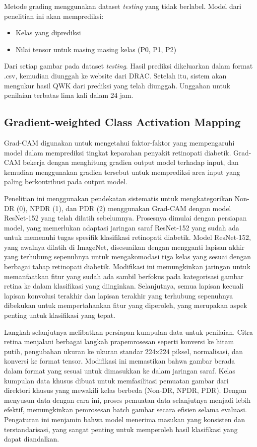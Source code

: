 Metode grading menggunakan dataset \emph{testing} yang tidak berlabel. Model dari penelitian ini akan memprediksi:
\begin{itemize}
	\item Kelas yang diprediksi
	\item Nilai tensor untuk masing masing kelas (P0, P1, P2)
\end{itemize}
Dari setiap gambar pada dataset \emph{testing}. Hasil prediksi dikeluarkan dalam format .csv, kemudian diunggah ke website dari DRAC.
Setelah itu, sistem akan mengukur hasil QWK dari prediksi yang telah diunggah. Unggahan untuk penilaian terbatas lima kali dalam 24 jam.

\subsection{Gradient-weighted Class Activation Mapping}
\label{sec:327}
Grad-CAM digunakan untuk mengetahui faktor-faktor yang mempengaruhi model dalam memprediksi tingkat keparahan penyakit retinopati diabetik. Grad-CAM bekerja dengan menghitung gradien output model terhadap input, dan kemudian menggunakan gradien tersebut untuk memprediksi area input yang paling berkontribusi pada output model.

Penelitian ini menggunakan pendekatan sistematis untuk mengkategorikan Non-DR (0), NPDR (1), dan PDR (2) menggunakan Grad-CAM dengan model ResNet-152 yang telah dilatih sebelumnya. Prosesnya dimulai dengan persiapan model, yang memerlukan adaptasi jaringan saraf ResNet-152 yang sudah ada untuk memenuhi tugas spesifik klasifikasi retinopati diabetik. Model ResNet-152, yang awalnya dilatih di ImageNet, disesuaikan dengan mengganti lapisan akhir yang terhubung sepenuhnya untuk mengakomodasi tiga kelas yang sesuai dengan berbagai tahap retinopati diabetik. Modifikasi ini memungkinkan jaringan untuk memanfaatkan fitur yang sudah ada sambil berfokus pada kategorisasi gambar retina ke dalam klasifikasi yang diinginkan. Selanjutnya, semua lapisan kecuali lapisan konvolusi terakhir dan lapisan terakhir yang terhubung sepenuhnya dibekukan untuk mempertahankan fitur yang diperoleh, yang merupakan aspek penting untuk klasifikasi yang tepat.

Langkah selanjutnya melibatkan persiapan kumpulan data untuk penilaian. Citra retina menjalani berbagai langkah prapemrosesan seperti konversi ke hitam putih, pengubahan ukuran ke ukuran standar 224x224 piksel, normalisasi, dan konversi ke format tensor. Modifikasi ini memastikan bahwa gambar berada dalam format yang sesuai untuk dimasukkan ke dalam jaringan saraf. Kelas kumpulan data khusus dibuat untuk memfasilitasi pemuatan gambar dari direktori khusus yang mewakili kelas berbeda (Non-DR, NPDR, PDR). Dengan menyusun data dengan cara ini, proses pemuatan data selanjutnya menjadi lebih efektif, memungkinkan pemrosesan batch gambar secara efisien selama evaluasi. Pengaturan ini menjamin bahwa model menerima masukan yang konsisten dan terstandarisasi, yang sangat penting untuk memperoleh hasil klasifikasi yang dapat diandalkan.

